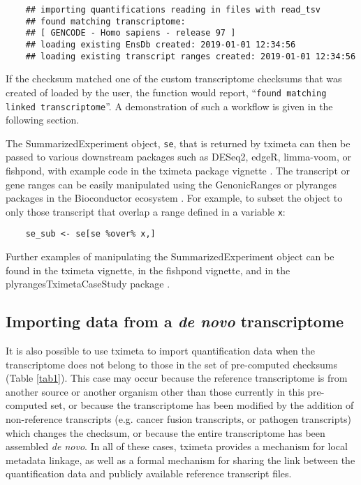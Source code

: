 \documentclass[12pt]{article} \usepackage[utf8]{inputenc}
\begin{document}
\begin{verbatim}
    ## importing quantifications reading in files with read_tsv 
    ## found matching transcriptome: 
    ## [ GENCODE - Homo sapiens - release 97 ]
    ## loading existing EnsDb created: 2019-01-01 12:34:56 
    ## loading existing transcript ranges created: 2019-01-01 12:34:56
\end{verbatim}

If the checksum matched one of the custom transcriptome checksums that
was created of loaded by the user, the function would report,
``\texttt{found matching linked transcriptome}''. A demonstration of
such a workflow is given in the following section.

The SummarizedExperiment object, \texttt{se}, that is returned by
tximeta can then be passed to various downstream packages such as
DESeq2, edgeR, limma-voom, or fishpond, with example code in the
tximeta package vignette \citep{deseq2,edger,limma,voom,swish}. The
transcript or gene ranges can be easily manipulated using the
GenonicRanges or plyranges packages in the Bioconductor ecosystem
\citep{granges,Lee2019}. For example, to subset the object to only
those transcript that overlap a range defined in a variable
\texttt{x}:

\begin{verbatim}
    se_sub <- se[se %over% x,]
\end{verbatim}

Further examples of manipulating the SummarizedExperiment object can
be found in the tximeta vignette, in the fishpond vignette, and in the
plyrangesTximetaCaseStudy package \citep{casestudy}.

\subsection*{Importing data from a \textit{de novo} transcriptome}

It is also possible to use tximeta to import quantification data when
the transcriptome does not belong to those in the set of pre-computed
checksums (Table \ref{tab1}). This case may occur because the
reference transcriptome is from another source or another organism
other than those currently in this pre-computed set, or because the
transcriptome has been modified by the addition of non-reference
transcripts (e.g. cancer fusion transcripts, or pathogen transcripts)
which changes the checksum, or because the entire transcriptome has
been assembled \textit{de novo}. In all of these cases, tximeta
provides a mechanism for local metadata linkage, as well as a formal
mechanism for sharing the link between the quantification data and
publicly available reference transcript files.
\end{document}
